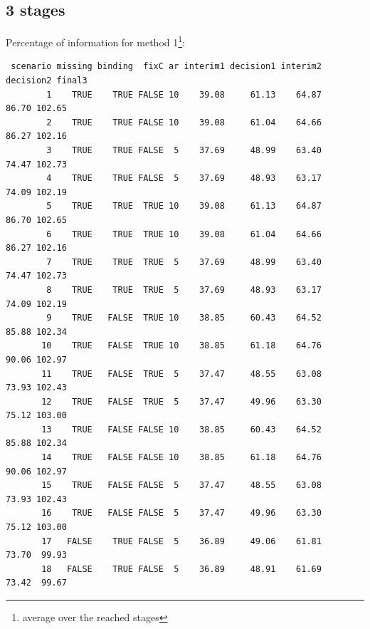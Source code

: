 \documentclass[12pt]{article}
\begin{document}
\subsection{3 stages}
\label{sec:org6b8d025}
Percentage of information for method 1\footnote{average over the reached stages}:
\begin{verbatim}
 scenario missing binding  fixC ar interim1 decision1 interim2 decision2 final3
        1    TRUE    TRUE FALSE 10    39.08     61.13    64.87     86.70 102.65
        2    TRUE    TRUE FALSE 10    39.08     61.04    64.66     86.27 102.16
        3    TRUE    TRUE FALSE  5    37.69     48.99    63.40     74.47 102.73
        4    TRUE    TRUE FALSE  5    37.69     48.93    63.17     74.09 102.19
        5    TRUE    TRUE  TRUE 10    39.08     61.13    64.87     86.70 102.65
        6    TRUE    TRUE  TRUE 10    39.08     61.04    64.66     86.27 102.16
        7    TRUE    TRUE  TRUE  5    37.69     48.99    63.40     74.47 102.73
        8    TRUE    TRUE  TRUE  5    37.69     48.93    63.17     74.09 102.19
        9    TRUE   FALSE  TRUE 10    38.85     60.43    64.52     85.88 102.34
       10    TRUE   FALSE  TRUE 10    38.85     61.18    64.76     90.06 102.97
       11    TRUE   FALSE  TRUE  5    37.47     48.55    63.08     73.93 102.43
       12    TRUE   FALSE  TRUE  5    37.47     49.96    63.30     75.12 103.00
       13    TRUE   FALSE FALSE 10    38.85     60.43    64.52     85.88 102.34
       14    TRUE   FALSE FALSE 10    38.85     61.18    64.76     90.06 102.97
       15    TRUE   FALSE FALSE  5    37.47     48.55    63.08     73.93 102.43
       16    TRUE   FALSE FALSE  5    37.47     49.96    63.30     75.12 103.00
       17   FALSE    TRUE FALSE  5    36.89     49.06    61.81     73.70  99.93
       18   FALSE    TRUE FALSE  5    36.89     48.91    61.69     73.42  99.67
\end{verbatim}
\end{document}
